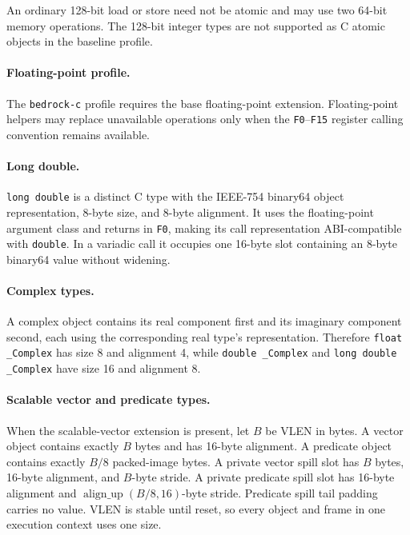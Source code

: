 \documentclass[10pt,twoside]{article}
\begin{document}
An ordinary 128-bit load or store need not be atomic and may use two 64-bit
memory operations. The 128-bit integer types are not supported as C atomic
objects in the baseline profile.

\paragraph{Floating-point profile.}
The \texttt{bedrock-c} profile requires the base floating-point extension.
Floating-point helpers may replace
unavailable operations only when the \texttt{F0}--\texttt{F15} register calling
convention remains available.

\paragraph{Long double.}
\texttt{long double} is a distinct C type with the IEEE-754 binary64 object
representation, 8-byte size, and 8-byte alignment. It uses the floating-point
argument class and returns in \texttt{F0}, making its call representation
ABI-compatible with \texttt{double}. In a variadic call it occupies one
16-byte slot containing an 8-byte binary64 value without widening.

\paragraph{Complex types.}
A complex object contains its real component first and its imaginary component
second, each using the corresponding real type's representation. Therefore
\texttt{float \_Complex} has size 8 and alignment 4, while
\texttt{double \_Complex} and \texttt{long double \_Complex} have size 16 and
alignment 8.

\paragraph{Scalable vector and predicate types.}
When the scalable-vector extension is present, let $B$ be VLEN in bytes. A
vector object contains exactly $B$ bytes and has 16-byte alignment. A
predicate object contains exactly $B/8$ packed-image bytes. A private vector
spill slot has $B$ bytes, 16-byte alignment, and $B$-byte stride. A private
predicate spill slot has 16-byte alignment and
$\operatorname{align\_up}(B/8,16)$-byte stride. Predicate spill tail padding
carries no value. VLEN is stable until reset, so every object and frame in one
execution context uses one size.
\end{document}
